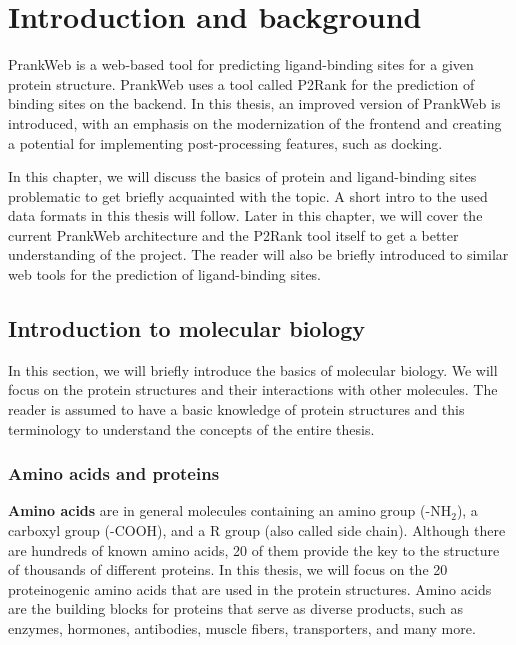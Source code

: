 \chapter{Introduction and background}
\label{chap:intro}

PrankWeb is a web-based tool for predicting ligand-binding sites for a given protein structure. PrankWeb uses a tool called P2Rank for the prediction of binding sites on the backend. In this thesis, an improved version of PrankWeb is introduced, with an emphasis on the modernization of the frontend and creating a potential for implementing post-processing features, such as docking.

In this chapter, we will discuss the basics of protein and ligand-binding sites problematic to get briefly acquainted with the topic. A short intro to the used data formats in this thesis will follow. Later in this chapter, we will cover the current PrankWeb architecture and the P2Rank tool itself to get a better understanding of the project. The reader will also be briefly introduced to similar web tools for the prediction of ligand-binding sites.

\section{Introduction to molecular biology}
\label{sec:mol_bio}

In this section, we will briefly introduce the basics of molecular biology. We will focus on the protein structures and their interactions with other molecules. The reader is assumed to have a basic knowledge of protein structures and this terminology to understand the concepts of the entire thesis.

\subsection{Amino acids and proteins}
\label{subsec:amino_acids}

\textbf{Amino acids} are in general molecules containing an amino group (-NH$_2$), a carboxyl group (-COOH), and a R group (also called side chain). Although there are hundreds of known amino acids, 20 of them provide the key to the structure of thousands of different proteins. In this thesis, we will focus on the 20 proteinogenic amino acids that are used in the protein structures. Amino acids are the building blocks for proteins that serve as diverse products, such as enzymes, hormones, antibodies, muscle fibers, transporters, and many more.

